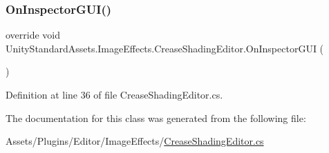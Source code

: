\subsubsection{\texorpdfstring{On\+Inspector\+G\+U\+I()}{OnInspectorGUI()}}
{\footnotesize\ttfamily override void Unity\+Standard\+Assets.\+Image\+Effects.\+Crease\+Shading\+Editor.\+On\+Inspector\+G\+UI (\begin{DoxyParamCaption}{ }\end{DoxyParamCaption})}



Definition at line 36 of file Crease\+Shading\+Editor.\+cs.



The documentation for this class was generated from the following file\+:\begin{DoxyCompactItemize}
\item 
Assets/\+Plugins/\+Editor/\+Image\+Effects/\mbox{\hyperlink{_crease_shading_editor_8cs}{Crease\+Shading\+Editor.\+cs}}\end{DoxyCompactItemize}
